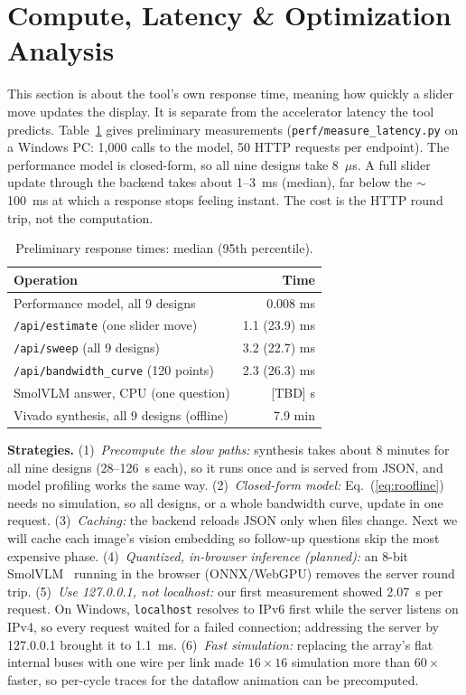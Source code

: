 \section{Compute, Latency \& Optimization Analysis}
\label{sec:latency}

This section is about the tool's own response time, meaning how quickly a
slider move updates the display. It is separate from the accelerator latency
the tool predicts. Table~\ref{tab:latency} gives preliminary measurements
(\texttt{perf/measure\_latency.py} on a Windows PC: 1{,}000 calls to the
model, 50 HTTP requests per endpoint). The performance model is closed-form,
so all nine designs take 8~$\mu$s. A full slider update through the backend
takes about 1--3~ms (median), far below the $\sim$100~ms at which a
response stops feeling instant. The cost is the HTTP round trip, not the
computation.

\begin{table}[t]
\centering
\small
\caption{Preliminary response times: median (95th percentile).}
\label{tab:latency}
\begin{tabular}{l r}
\hline
Operation & Time \\
\hline
Performance model, all 9 designs & 0.008 ms \\
\texttt{/api/estimate} (one slider move) & 1.1 (23.9) ms \\
\texttt{/api/sweep} (all 9 designs) & 3.2 (22.7) ms \\
\texttt{/api/bandwidth\_curve} (120 points) & 2.3 (26.3) ms \\
SmolVLM answer, CPU (one question) & [TBD] s \\
Vivado synthesis, all 9 designs (offline) & 7.9 min \\
\hline
\end{tabular}
\end{table}

\textbf{Strategies.} (1)~\emph{Precompute the slow paths:} synthesis takes
about 8 minutes for all nine designs (28--126~s each), so it runs once and is
served from JSON,
and model profiling works the same way. (2)~\emph{Closed-form model:}
Eq.~(\ref{eq:roofline}) needs no simulation, so all designs, or a whole
bandwidth curve, update in one request. (3)~\emph{Caching:} the backend
reloads JSON only when files change. Next we will cache each image's vision
embedding so follow-up questions skip the most expensive phase.
(4)~\emph{Quantized, in-browser inference (planned):} an 8-bit
SmolVLM~\cite{jacob2018quantization} running in the browser (ONNX/WebGPU)
removes the server round trip. (5)~\emph{Use 127.0.0.1, not localhost:} our first
measurement showed 2.07~s per request. On Windows, \texttt{localhost}
resolves to IPv6 first while the server listens on IPv4, so every request
waited for a failed connection; addressing the server by 127.0.0.1 brought
it to 1.1~ms. (6)~\emph{Fast simulation:} replacing the array's
flat internal buses with one wire per link made $16\times16$ simulation more
than $60\times$ faster, so per-cycle traces for the dataflow animation can be
precomputed.

